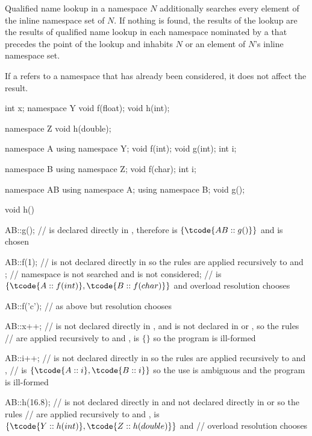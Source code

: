 \pnum
Qualified name lookup in a namespace $N$ additionally searches
every element of the inline namespace set of $N$.
If nothing is found,
the results of the lookup are the results of qualified name lookup
in each namespace nominated by a 
that precedes the point of the lookup and
inhabits $N$ or an element of $N$'s inline namespace set.
\begin{note}
If a  refers to a namespace
that has already been considered, it does not affect the result.
\end{note}
\begin{example}
\begin{codeblock}
int x;
namespace Y {
  void f(float);
  void h(int);
}

namespace Z {
  void h(double);
}

namespace A {
  using namespace Y;
  void f(int);
  void g(int);
  int i;
}

namespace B {
  using namespace Z;
  void f(char);
  int i;
}

namespace AB {
  using namespace A;
  using namespace B;
  void g();
}

void h()
{
  AB::g();          //  is declared directly in , therefore  is $\{ \tcode{AB::g()} \}$ and  is chosen

  AB::f(1);         //  is not declared directly in  so the rules are applied recursively to  and ;
                    // namespace  is not searched and  is not considered;
                    //  is $\{ \tcode{A::f(int)}, \tcode{B::f(char)} \}$ and overload resolution chooses 

  AB::f('c');       // as above but resolution chooses 

  AB::x++;          //  is not declared directly in , and is not declared in  or , so the rules
                    // are applied recursively to  and ,  is $\{ \}$ so the program is ill-formed

  AB::i++;          //  is not declared directly in  so the rules are applied recursively to  and ,
                    //  is $\{ \tcode{A::i}, \tcode{B::i} \}$ so the use is ambiguous and the program is ill-formed

  AB::h(16.8);      //  is not declared directly in  and not declared directly in  or  so the rules
                    // are applied recursively to  and ,  is $\{ \tcode{Y::h(int)}, \tcode{Z::h(double)} \}$ and
                    // overload resolution chooses 
}
\end{codeblock}
\end{example}


